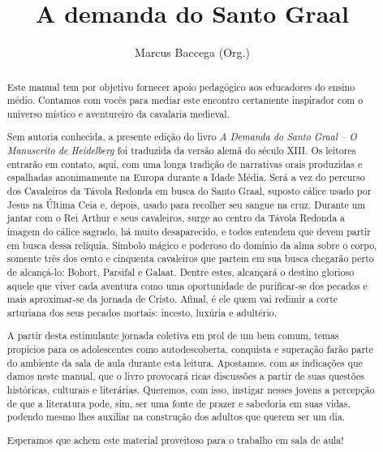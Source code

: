 \documentclass[11pt]{extarticle}
\begin{document}
\newcommand{\AutorLivro}{Marcus Baccega (Org.)}
\newcommand{\TituloLivro}{A demanda do Santo Graal}
\newcommand{\Tema}{Ficção, mistério e fantasia}
\newcommand{\Genero}{Conto, crônica e novela}
\newcommand{\imagemCapa}{./images/PNLD0006-01.png}
\newcommand{\issnppub}{---}
\newcommand{\issnepub}{---}
\newcommand{\colaborador}{\textbf{Clarice Assalim, Bruno Gradella e Vicente Castro} é uma pessoa incrível e vai fazer um bom serviço.}




\title{\TituloLivro}
\author{\AutorLivro}
\def\authornotes{\colaborador}

\date{}
\maketitle


\begin{abstract}

Este manual tem por objetivo fornecer apoio pedagógico aos educadores do 
ensino médio. Contamos com vocês para mediar este encontro certamente 
inspirador com o universo místico e aventureiro da cavalaria medieval.

Sem autoria conhecida, a presente edição do livro \emph{A Demanda do Santo Graal -- 
O Manuscrito de Heidelberg} foi traduzida da versão alemã do século XIII. 
Os leitores entrarão em contato, aqui, com uma longa tradição de narrativas orais 
produzidas e espalhadas anonimamente na Europa durante a Idade Média. Será a vez 
do percurso dos Cavaleiros da Távola Redonda em busca do Santo Graal, suposto 
cálice usado por Jesus na Última Ceia e, depois, usado para recolher seu sangue na cruz. 
Durante um jantar com o Rei Arthur e seus cavaleiros, surge ao centro da Távola Redonda 
a imagem do cálice sagrado, há muito desaparecido, e todos entendem que devem partir 
em busca dessa relíquia. Símbolo mágico e poderoso do domínio da alma sobre o corpo, 
somente três dos cento e cinquenta cavaleiros que partem em sua busca chegarão perto 
de alcançá-lo: Bohort, Parsifal e Galaat. Dentre estes, alcançará o destino glorioso 
aquele que viver cada aventura como uma oportunidade de purificar-se dos pecados e mais 
aproximar-se da jornada de Cristo. Afinal, é ele quem vai redimir a corte arturiana 
dos seus pecados mortais: incesto, luxúria e adultério.

A partir desta estimulante jornada coletiva em prol de um bem comum, temas 
propícios para os adolescentes como autodescoberta, conquista e superação 
farão parte do ambiente da sala de aula durante esta leitura. Apostamos, 
com as indicações que damos neste manual, que o livro provocará ricas 
discussões a partir de suas questões históricas, culturais e literárias. 
Queremos, com isso, instigar nesses jovens a percepção de que a literatura 
pode, sim, ser uma fonte de prazer e sabedoria em suas vidas, podendo mesmo 
lhes auxiliar na construção dos adultos que querem ser um dia. 

Esperamos que achem este material proveitoso para o trabalho em sala de aula!

\end{abstract}
\end{document}
